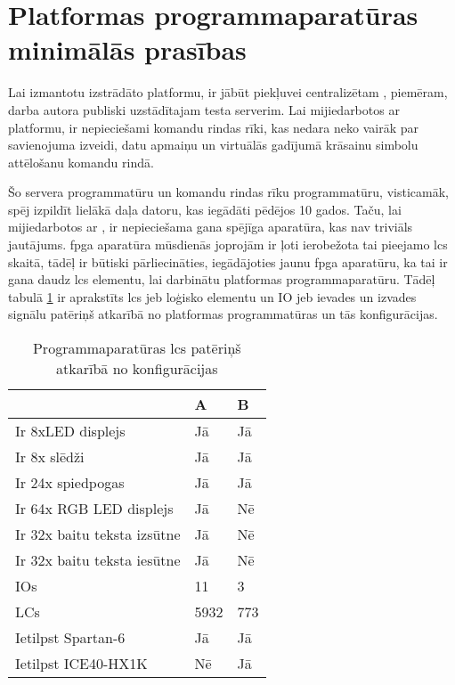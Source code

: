\section{Platformas programmaparatūras minimālās prasības}
\label{sec:minrequirements}

Lai izmantotu izstrādāto platformu, ir jābūt piekļuvei centralizētam
, piemēram, darba autora publiski uzstādītajam testa
serverim. Lai mijiedarbotos ar platformu, ir nepieciešami komandu rindas rīki,
kas nedara neko vairāk par savienojuma izveidi, datu apmaiņu un virtuālās
 gadījumā krāsainu simbolu attēlošanu komandu
rindā.

Šo servera programmatūru un komandu rindas rīku programmatūru, visticamāk, spēj
izpildīt lielākā daļa datoru, kas iegādāti pēdējos 10 gados.  Taču, lai
mijiedarbotos ar , ir nepieciešama
gana spējīga aparatūra, kas nav triviāls jautājums. \gls{fpga} aparatūra
mūsdienās joprojām ir ļoti ierobežota tai pieejamo \gls{lcs} skaitā, tādēļ ir
būtiski pārliecināties, iegādājoties jaunu \gls{fpga} aparatūru, ka tai ir gana
daudz \gls{lcs} elementu, lai darbinātu platformas programmaparatūru. Tādēļ
tabulā \ref{table:lcusage} ir aprakstīts \gls{lcs} jeb loģisko elementu un IO
jeb ievades un izvades signālu patēriņš atkarībā no platformas programmatūras un
tās konfigurācijas.

\begin{table}[H]
    \begin{tabular}{ |p{5cm}|p{3cm}|p{3cm}| }
    \hline
        & A & B\\
    \hline
    Ir 8xLED displejs & Jā & Jā \\
    Ir 8x slēdži & Jā & Jā \\
    Ir 24x spiedpogas & Jā & Jā \\
    Ir 64x RGB LED displejs & Jā & Nē \\
    Ir 32x baitu teksta izsūtne & Jā & Nē \\
    Ir 32x baitu teksta iesūtne & Jā & Nē \\
    \hline
    IOs & 11 & 3 \\
    LCs & 5932 & 773 \\
    \hline
    Ietilpst Spartan-6 & Jā & Jā \\
    Ietilpst ICE40-HX1K & Nē & Jā \\
    \hline
    \end{tabular}
    \centering
    \captionsetup{justification=centering}
    \caption{Programmaparatūras \gls{lcs} patēriņš atkarībā no konfigurācijas}
    \label{table:lcusage}
\end{table}

